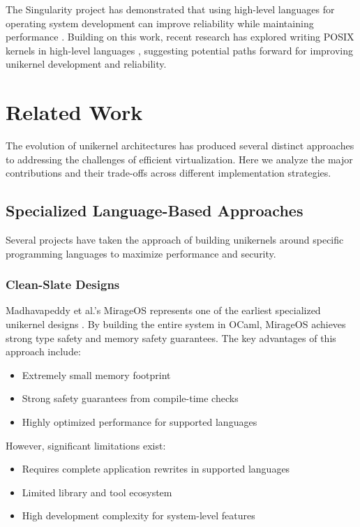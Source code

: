 \documentclass[conference]{IEEEtran}
\begin{document}
The Singularity project has demonstrated that using high-level languages for operating system development can improve reliability while maintaining performance \cite{singularity}. Building on this work, recent research has explored writing POSIX kernels in high-level languages \cite{go_kernel}, suggesting potential paths forward for improving unikernel development and reliability.

\section{Related Work}
The evolution of unikernel architectures has produced several distinct approaches to addressing the challenges of efficient virtualization. Here we analyze the major contributions and their trade-offs across different implementation strategies.

\subsection{Specialized Language-Based Approaches}
Several projects have taken the approach of building unikernels around specific programming languages to maximize performance and security.

\subsubsection{Clean-Slate Designs}
Madhavapeddy et al.'s MirageOS represents one of the earliest specialized unikernel designs \cite{linux_kernel_clothing}. By building the entire system in OCaml, MirageOS achieves strong type safety and memory safety guarantees. The key advantages of this approach include:

\begin{itemize}
	\item Extremely small memory footprint
	\item Strong safety guarantees from compile-time checks
	\item Highly optimized performance for supported languages
\end{itemize}

However, significant limitations exist:
\begin{itemize}
	\item Requires complete application rewrites in supported languages
	\item Limited library and tool ecosystem
	\item High development complexity for system-level features
\end{itemize}
\end{document}
